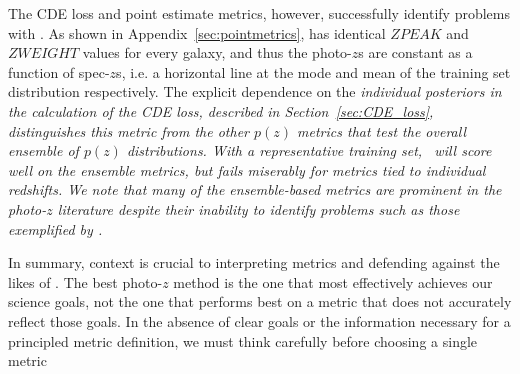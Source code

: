 The CDE loss and point estimate metrics, however, successfully identify problems with \trainz.
As shown in Appendix~\ref{sec:pointmetrics}, \trainz has identical $ZPEAK$ and $ZWEIGHT$ values for every galaxy, and thus the photo-$z$s are constant as a function of spec-$z$s, i.e. a horizontal line at the mode and mean of the training set distribution respectively.  The explicit dependence on the \it{individual} posteriors in the calculation of the CDE loss, described in Section~\ref{sec:CDE_loss}, distinguishes this metric from the other $p(z)$ metrics that test the overall ensemble of $p(z)$ distributions.  With a representative training set, \trainz\ will score well on the ensemble metrics, but fails miserably for metrics tied to individual redshifts.  We note that many of the ensemble-based metrics are prominent in the photo-$z$ literature despite their inability to identify problems such as those exemplified by \trainz.


In summary, context is crucial to interpreting metrics and defending against the likes of \trainz.
The best photo-$z$ method is the one that most effectively achieves our science goals, not the one that performs best on a metric that does not accurately reflect those goals.
In the absence of clear goals or the information necessary for a principled metric definition, we must think carefully before choosing a single metric

